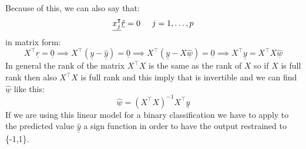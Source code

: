Because of this, we can also say that:
\[
    \underline{x_j^\intercal}\underline{\hat{r}} = 0 \hspace{0.5cm} j = 1, \dots, p    
\]
in matrix form:
\[
    X^\intercal \underline{\hat{r}} = \underline{0}   \implies X^\intercal (\underline{y} - \underline{\hat{y}}) = \underline{0} \implies X^\intercal (\underline{y} - X\underline{\hat{w}}) = \underline{0} \implies X^\intercal \underline{y} = X^\intercal X \underline{\hat{w}}
\]
In general the rank of the matrix $X^\intercal X$ is the same as the rank of $X$ so if $X$ is full rank then also $X^\intercal X$ is full rank and this imply that is invertible and we can find $\hat{\underline{w}}$ like this:
\[
    \hat{\underline{w}} = (X^\intercal X)^{-1}X^\intercal \underline{y}
\]
If we are using this linear model for a binary classification we have to apply to the predicted value $\hat{\underline{y}}$ a sign function in order to have the output restrained to \{-1,1\}.\\

